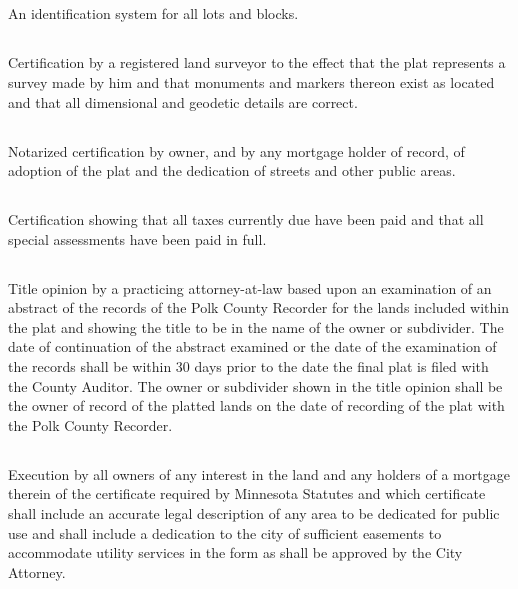 \subsection{}
An identification system for all lots and blocks.
\subsection{}
Certification by a registered land surveyor to the effect that the plat represents a survey made by him and that monuments and markers thereon exist as located and that all dimensional and geodetic details are correct.
\subsection{}
Notarized certification by owner, and by any mortgage holder of record, of adoption of the plat and the dedication of streets and other public areas.
\subsection{}
Certification showing that all taxes currently due have been paid and that all special assessments have been paid in full.
\subsection{}
Title opinion by a practicing attorney-at-law based upon an examination of an abstract of the records of the Polk County Recorder for the lands included within the plat and showing the title to be in the name of the owner or subdivider. The date of continuation of the abstract examined or the date of the examination of the records shall be within 30 days prior to the date the final plat is filed with the County Auditor. The owner or subdivider shown in the title opinion shall be the owner of record of the platted lands on the date of recording of the plat with the Polk County Recorder.
\subsection{}
Execution by all owners of any interest in the land and any holders of a mortgage therein of the certificate required by Minnesota Statutes and which certificate shall include an accurate legal description of any area to be dedicated for public use and shall include a dedication to the city of sufficient easements to accommodate utility services in the form as shall be approved by the City Attorney.

